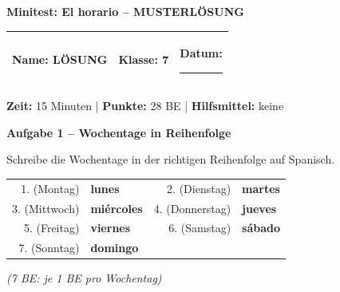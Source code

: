 \documentclass[11pt, a4paper]{article}
\newcommand{\fachfarbe}{spanisch}
\newcommand{\thema}{Minitest: El horario -- MUSTERLÖSUNG}
\newcommand{\klasse}{7}
\newcommand{\maxpunkte}{28}
\newcommand{\zeit}{15 Minuten}
\newcommand{\punktebox}[1]{\hfill\fbox{\small \_\_\_/#1}}
\newcommand{\luecke}[1]{\rule{#1}{0.4pt}}
\newcommand{\lsg}[1]{\textcolor{loesung}{\textbf{#1}}}
\newenvironment{aufgabe}[1]{%
    \vspace{12pt}
    \noindent\textbf{\textcolor{\fachfarbe}{Aufgabe #1}}
    \vspace{6pt}
    \begin{list}{}{\leftmargin=0pt}
    \item[]
}{%
    \end{list}
}
\begin{document}

\begin{center}
    {\Large\bfseries\textcolor{loesung}{\thema}}
\end{center}

\vspace{5pt}

\noindent
\begin{tabularx}{\textwidth}{|X|X|X|}
\hline
\textbf{Name:} \lsg{LÖSUNG} &
\textbf{Klasse:} \klasse &
\textbf{Datum:} \luecke{2cm} \\
\hline
\end{tabularx}

\vspace{10pt}

\begin{infobox}
\textbf{Zeit:} \zeit{} | \textbf{Punkte:} \maxpunkte{} BE | \textbf{Hilfsmittel:} keine
\end{infobox}

\vspace{15pt}


\begin{aufgabe}{1 -- Wochentage in Reihenfolge}
Schreibe die Wochentage in der richtigen Reihenfolge auf Spanisch. \punktebox{7}
\end{aufgabe}

\noindent
\begin{tabular}{rlrl}
1. (Montag) & \lsg{lunes} & 2. (Dienstag) & \lsg{martes} \\[0.8em]
3. (Mittwoch) & \lsg{miércoles} & 4. (Donnerstag) & \lsg{jueves} \\[0.8em]
5. (Freitag) & \lsg{viernes} & 6. (Samstag) & \lsg{sábado} \\[0.8em]
7. (Sonntag) & \lsg{domingo} & & \\
\end{tabular}

\textcolor{loesung}{\textit{(7 BE: je 1 BE pro Wochentag)}}

\vspace{15pt}

\end{document}
